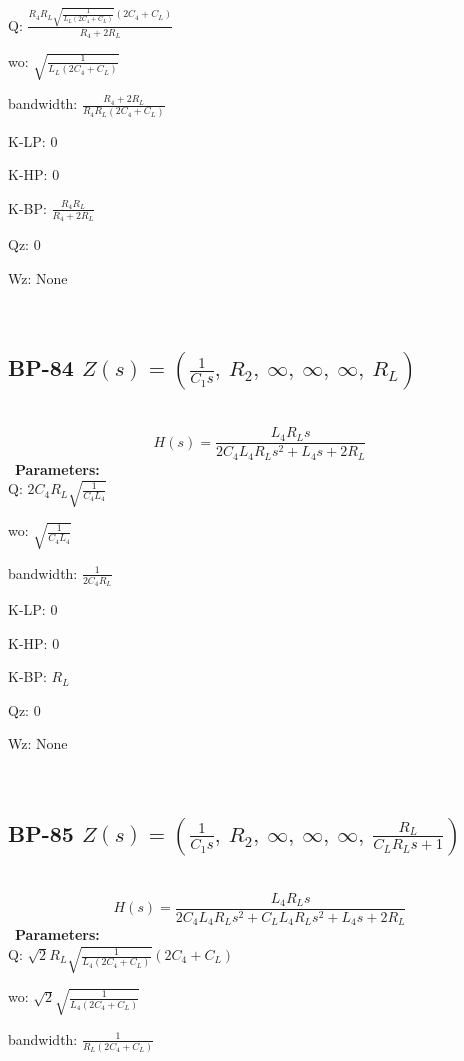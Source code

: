 \documentclass{article}
\begin{document}
Q: $\frac{R_{4} R_{L} \sqrt{\frac{1}{L_{L} \left(2 C_{4} + C_{L}\right)}} \left(2 C_{4} + C_{L}\right)}{R_{4} + 2 R_{L}}$\ 

wo: $\sqrt{\frac{1}{L_{L} \left(2 C_{4} + C_{L}\right)}}$\ 

bandwidth: $\frac{R_{4} + 2 R_{L}}{R_{4} R_{L} \left(2 C_{4} + C_{L}\right)}$\ 

K-LP: $0$\ 

K-HP: $0$\ 

K-BP: $\frac{R_{4} R_{L}}{R_{4} + 2 R_{L}}$\ 

Qz: $0$\ 

Wz: $\text{None}$\ 

\ 

\subsection{BP-84 $Z(s) = \left( \frac{1}{C_{1} s}, \  R_{2}, \  \infty, \  \infty, \  \infty, \  R_{L}\right)$ } \ 
\textbf{\[H(s) = \frac{L_{4} R_{L} s}{2 C_{4} L_{4} R_{L} s^{2} + L_{4} s + 2 R_{L}}\] } \ 
\textbf{Parameters:}\\ 

Q: $2 C_{4} R_{L} \sqrt{\frac{1}{C_{4} L_{4}}}$\ 

wo: $\sqrt{\frac{1}{C_{4} L_{4}}}$\ 

bandwidth: $\frac{1}{2 C_{4} R_{L}}$\ 

K-LP: $0$\ 

K-HP: $0$\ 

K-BP: $R_{L}$\ 

Qz: $0$\ 

Wz: $\text{None}$\ 

\ 

\subsection{BP-85 $Z(s) = \left( \frac{1}{C_{1} s}, \  R_{2}, \  \infty, \  \infty, \  \infty, \  \frac{R_{L}}{C_{L} R_{L} s + 1}\right)$ } \ 
\textbf{\[H(s) = \frac{L_{4} R_{L} s}{2 C_{4} L_{4} R_{L} s^{2} + C_{L} L_{4} R_{L} s^{2} + L_{4} s + 2 R_{L}}\] } \ 
\textbf{Parameters:}\\ 

Q: $\sqrt{2} R_{L} \sqrt{\frac{1}{L_{4} \left(2 C_{4} + C_{L}\right)}} \left(2 C_{4} + C_{L}\right)$\ 

wo: $\sqrt{2} \sqrt{\frac{1}{L_{4} \left(2 C_{4} + C_{L}\right)}}$\ 

bandwidth: $\frac{1}{R_{L} \left(2 C_{4} + C_{L}\right)}$\ 
\end{document}
